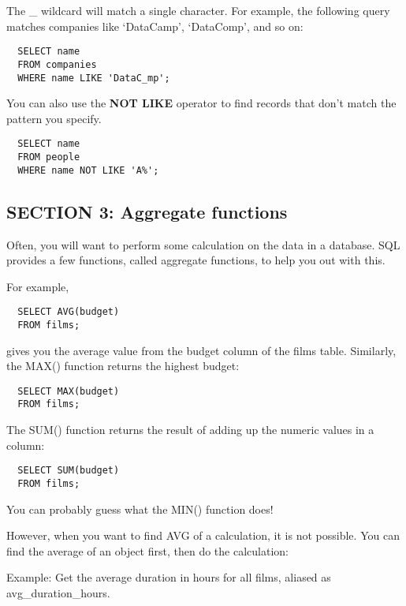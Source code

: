 \documentclass[
]{article}
\begin{document}
The \_ wildcard will match a single character. For example, the
following query matches companies like `DataCamp', `DataComp', and so
on:

\begin{verbatim}
  SELECT name
  FROM companies
  WHERE name LIKE 'DataC_mp';
\end{verbatim}

You can also use the \textbf{NOT LIKE} operator to find records that
don't match the pattern you specify.

\begin{verbatim}
  SELECT name
  FROM people
  WHERE name NOT LIKE 'A%';
\end{verbatim}

\hypertarget{section-3-aggregate-functions}{%
\subsection{SECTION 3: Aggregate
functions}\label{section-3-aggregate-functions}}

Often, you will want to perform some calculation on the data in a
database. SQL provides a few functions, called aggregate functions, to
help you out with this.

For example,

\begin{verbatim}
  SELECT AVG(budget)
  FROM films;
\end{verbatim}

gives you the average value from the budget column of the films table.
Similarly, the MAX() function returns the highest budget:

\begin{verbatim}
  SELECT MAX(budget)
  FROM films;
\end{verbatim}

The SUM() function returns the result of adding up the numeric values in
a column:

\begin{verbatim}
  SELECT SUM(budget)
  FROM films;
\end{verbatim}

You can probably guess what the MIN() function does!

However, when you want to find AVG of a calculation, it is not possible.
You can find the average of an object first, then do the calculation:

Example: Get the average duration in hours for all films, aliased as
avg\_duration\_hours.
\end{document}
